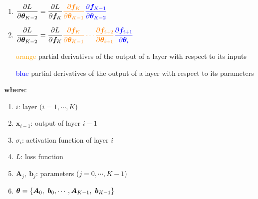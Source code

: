 \begin{enumerate}
\begin{multicols}{2}
\begin{enumerate}[resume*=grad-dnn]
        \item
        $
            \dfrac{\partial L}{\partial \bm{\theta}_{K-2}}
            = \dfrac{\partial L}{\partial \bm{f}_K}
            \textcolor{orange}{\dfrac{\partial \bm{f}_K}{\partial \bm{\theta}_{K-1}}}
            \textcolor{blue}{\dfrac{\partial \bm{f}_{K-1}}{\partial \bm{\theta}_{K-2}}}
        $
        \hfill \cite{mfml/book/mml/Deisenroth-Faisal-Ong}

        \item
        $
            \dfrac{\partial L}{\partial \bm{\theta}_{K-2}}
            = \dfrac{\partial L}{\partial \bm{f}_K}
            \textcolor{orange}{
                \dfrac{\partial \bm{f}_K}{\partial \bm{\theta}_{K-1}}
                \cdots
                \dfrac{\partial \bm{f}_{i+2}}{\partial \bm{\theta}_{i+1}}
            }
            \textcolor{blue}{\dfrac{\partial \bm{f}_{i+1}}{\partial \bm{\theta}_{i}}}
        $
        \hfill \cite{mfml/book/mml/Deisenroth-Faisal-Ong}
    \end{enumerate}
    \end{multicols}
    \begin{enumerate}
        \item [\textcolor{orange}{orange}] partial derivatives of the output of a layer with respect to its inputs

        \item [\textcolor{blue}{blue}] partial derivatives of the output of a layer with respect to its parameters
    \end{enumerate}
    \vspace{0.5cm}
    \textbf{where}:
    \begin{multicols}{2}
    \begin{enumerate}
        \item $i$: layer ($i = 1,\cdots,K$)
        \hfill \cite{mfml/book/mml/Deisenroth-Faisal-Ong}

        \item $\bm{x}_{i-1}$: output of layer $i - 1$
        \hfill \cite{mfml/book/mml/Deisenroth-Faisal-Ong}

        \item $\sigma_i$: activation function of layer $i$
        \hfill \cite{mfml/book/mml/Deisenroth-Faisal-Ong}

        \item $L$: loss function
        \hfill \cite{mfml/book/mml/Deisenroth-Faisal-Ong}

        \item $\bm{A}_{j},\ \bm{b}_{j}$: parameters ($j = 0,\cdots,K-1$)
        \hfill \cite{mfml/book/mml/Deisenroth-Faisal-Ong}

        \item $\bm{\theta} = \dCurlyBrac{\bm{A}_{0},\ \bm{b}_{0}, \cdots, \bm{A}_{K-1},\ \bm{b}_{K-1}}$
        \hfill \cite{mfml/book/mml/Deisenroth-Faisal-Ong}
    \end{enumerate}
    \end{multicols}

\end{enumerate}
